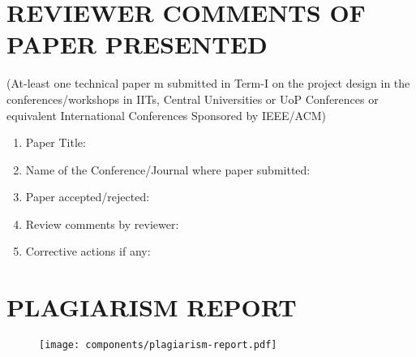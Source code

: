 \begin{appendices}
	\chapter[Reviewer comments of paper presented]{REVIEWER COMMENTS OF PAPER PRESENTED}
		(At-least one technical paper m submitted in Term-I on the project design in the conferences/workshops in IITs, Central Universities or UoP Conferences or equivalent International Conferences Sponsored by IEEE/ACM)

		\begin{enumerate}
			\item Paper Title:
			\vspace{1cm}
			\item Name of the Conference/Journal where paper submitted:
			\vspace{1cm}
			\item Paper accepted/rejected: 
			\vspace{1cm}
			\item Review comments by reviewer:
			\vspace{1cm}
			\item Corrective actions if any:
		\end{enumerate}
	
	\chapter[Plagiarism Report]{PLAGIARISM REPORT}
		\begin{figure}[h!]
			\centering
			\texttt{[image: components/plagiarism-report.pdf]}
		\end{figure}
\end{appendices}